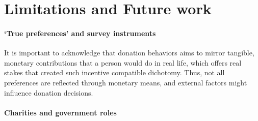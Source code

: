 






\section{Limitations and Future work}
\label{sec:limitations}

\paragraph{`True preferences' and survey instruments}
It is important to acknowledge that donation behaviors aims to mirror tangible, monetary contributions that a person would do in real life, which offers real stakes that created such incentive compatible dichotomy. Thus, not all preferences are reflected through monetary means, and external factors might influence donation decisions.

\paragraph{Charities and government roles}

